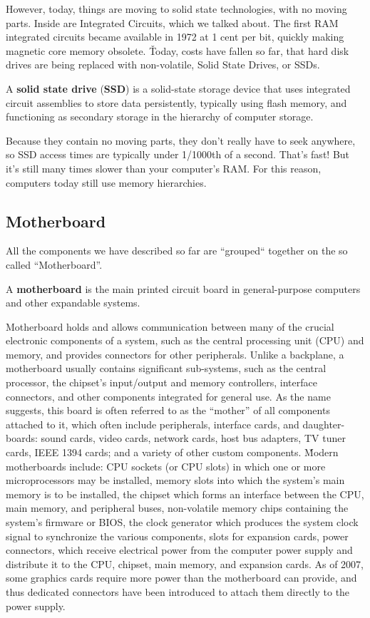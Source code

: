 However, today, things are moving to solid state technologies, with no moving parts. Inside are Integrated Circuits,
which we talked about. The first RAM integrated circuits became available in 1972 at 1 cent per bit, quickly making
magnetic core memory obsolete. \v

Today, costs have fallen so far, that hard disk drives are being replaced with non-volatile, Solid State Drives, or
SSDs.

A \textbf{solid state drive} (\textbf{SSD}) is a solid-state storage device that uses integrated circuit assemblies
to store data persistently, typically using flash memory, and functioning as secondary storage in the hierarchy of
computer storage.
\ed


Because they contain no moving parts, they don't really have to seek anywhere, so SSD access times are typically
under 1/1000th of a second. That's fast! But it's still many times slower than your computer's RAM. For this reason,
computers today still use memory hierarchies.

\subsection{Motherboard}
All the components we have described so far are ``grouped`` together on the so called ``Motherboard''.

\bd[Motherboard]
A \textbf{motherboard} is the main printed circuit board in general-purpose computers and other expandable systems.
\ed

Motherboard holds and allows communication between many of the crucial electronic components of a system, such as the
central processing unit (CPU) and memory, and provides connectors for other peripherals. Unlike a backplane, a
motherboard usually contains significant sub-systems, such as the central processor, the chipset's input/output and
memory controllers, interface connectors, and other components integrated for general use. As the name suggests, this
board is often referred to as the ``mother'' of all components attached to it, which often include peripherals,
interface cards, and daughter-boards: sound cards, video cards, network cards, host bus adapters, TV tuner cards,
IEEE 1394 cards; and a variety of other custom components. \v

Modern motherboards include: CPU sockets (or CPU slots) in which one or more microprocessors may be installed, memory
slots into which the system's main memory is to be installed, the chipset which forms an interface between the CPU,
main memory, and peripheral buses, non-volatile memory chips containing the system's firmware or BIOS, the clock
generator which produces the system clock signal to synchronize the various components, slots for expansion cards,
power connectors, which receive electrical power from the computer power supply and distribute it to the CPU,
chipset, main memory, and expansion cards. As of 2007, some graphics cards require more power than the motherboard
can provide, and thus dedicated connectors have been introduced to attach them directly to the power supply.

